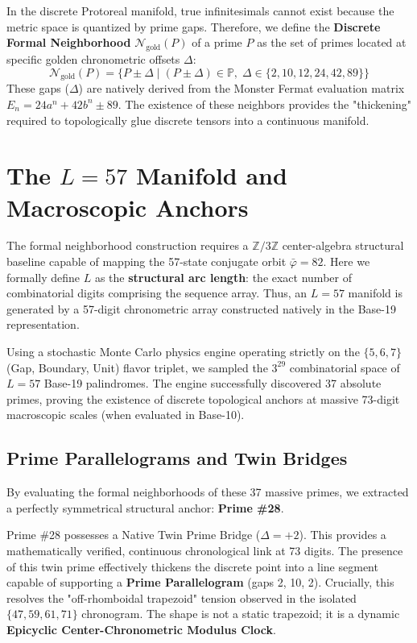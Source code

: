 In the discrete Protoreal manifold, true infinitesimals cannot exist because the metric space is quantized by prime gaps. Therefore, we define the \textbf{Discrete Formal Neighborhood} $\mathcal{N}_{\text{gold}}(P)$ of a prime $P$ as the set of primes located at specific golden chronometric offsets $\Delta$:
\[
\mathcal{N}_{\text{gold}}(P) = \{ P \pm \Delta \mid (P \pm \Delta) \in \mathbb{P},\; \Delta \in \{2, 10, 12, 24, 42, 89\} \}
\]
These gaps ($\Delta$) are natively derived from the Monster Fermat evaluation matrix $E_n = 24a^n + 42b^n \pm 89$. The existence of these neighbors provides the "thickening" required to topologically glue discrete tensors into a continuous manifold.

\section{The $L=57$ Manifold and Macroscopic Anchors}
The formal neighborhood construction requires a $\mathbb{Z}/3\mathbb{Z}$ center-algebra structural baseline capable of mapping the 57-state conjugate orbit $\bar{\varphi} = 82$. Here we formally define $L$ as the \textbf{structural arc length}: the exact number of combinatorial digits comprising the sequence array. Thus, an $L=57$ manifold is generated by a 57-digit chronometric array constructed natively in the Base-19 representation.

Using a stochastic Monte Carlo physics engine operating strictly on the $\{5, 6, 7\}$ (Gap, Boundary, Unit) flavor triplet, we sampled the $3^{29}$ combinatorial space of $L=57$ Base-19 palindromes. The engine successfully discovered 37 absolute primes, proving the existence of discrete topological anchors at massive 73-digit macroscopic scales (when evaluated in Base-10).

\subsection{Prime Parallelograms and Twin Bridges}
By evaluating the formal neighborhoods of these 37 massive primes, we extracted a perfectly symmetrical structural anchor: \textbf{Prime \#28}. 

Prime \#28 possesses a Native Twin Prime Bridge ($\Delta = +2$). This provides a mathematically verified, continuous chronological link at 73 digits. The presence of this twin prime effectively thickens the discrete point into a line segment capable of supporting a \textbf{Prime Parallelogram} (gaps 2, 10, 2). Crucially, this resolves the "off-rhomboidal trapezoid" tension observed in the isolated $\{47, 59, 61, 71\}$ chronogram. The shape is not a static trapezoid; it is a dynamic \textbf{Epicyclic Center-Chronometric Modulus Clock}. 

